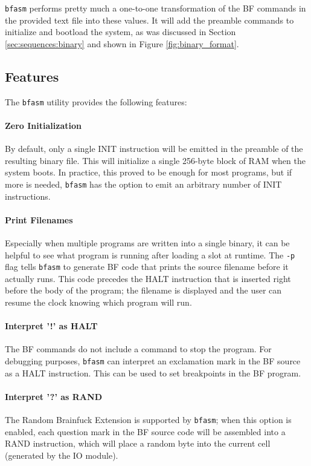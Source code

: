 \texttt{bfasm} performs pretty much a one-to-one transformation of the BF commands in the provided text file into these values. It will add the preamble commands to initialize and bootload the system, as was discussed in Section \ref{sec:sequences:binary} and shown in Figure \ref{fig:binary_format}.

\subsection{Features}
The \texttt{bfasm} utility provides the following features:
\paragraph{Zero Initialization} By default, only a single INIT instruction will be emitted in the preamble of the resulting binary file. This will initialize a single 256-byte block of RAM when the system boots. In practice, this proved to be enough for most programs, but if more is needed, \texttt{bfasm} has the option to emit an arbitrary number of INIT instructions.
\paragraph{Print Filenames} Especially when multiple programs are written into a single binary, it can be helpful to see what program is running after loading a slot at runtime. The \texttt{-p} flag tells \texttt{bfasm} to generate BF code that prints the source filename before it actually runs. This code precedes the HALT instruction that is inserted right before the body of the program; the filename is displayed and the user can resume the clock knowing which program will run.
\paragraph{Interpret '!' as HALT} The BF commands do not include a command to stop the program. For debugging purposes, \texttt{bfasm} can interpret an exclamation mark in the BF source as a HALT instruction. This can be used to set breakpoints in the BF program.
\paragraph{Interpret '?' as RAND} The Random Brainfuck Extension is supported by \texttt{bfasm}; when this option is enabled, each question mark in the BF source code will be assembled into a RAND instruction, which will place a random byte into the current cell (generated by the IO module).

